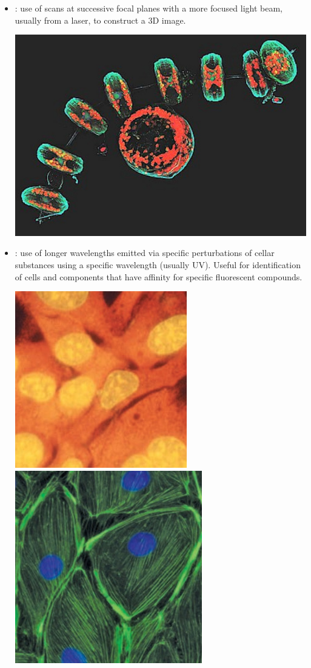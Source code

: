 \begin{itemize}
\begin{center}
  \end{center}
  \item {}: use of scans at successive focal planes with a more focused light beam, usually from a laser, to construct a 3D image.
  \begin{center}
    \includegraphics[scale=0.50]{images/week-1-1c.jpg}
  \end{center}
  \item {}: use of longer wavelengths emitted via specific perturbations of cellar substances using a specific wavelength (usually UV). Useful for identification of cells and components that have affinity for specific fluorescent compounds. 
  \begin{center}
    \includegraphics[scale=0.60]{images/week-1-1d.jpg}
    \includegraphics[scale=0.55]{images/week-1-1e.jpg}

\end{center}
\end{itemize}
